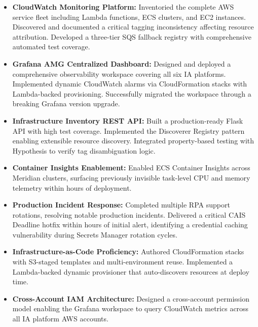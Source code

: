 \begin{itemize}
    \item \textbf{CloudWatch Monitoring Platform:} Inventoried the complete AWS
          service fleet including Lambda functions, ECS clusters, and EC2
          instances. Discovered and documented a critical tagging inconsistency
          affecting resource attribution. Developed a three-tier SQS fallback
          registry with comprehensive automated test coverage.

    \item \textbf{Grafana AMG Centralized Dashboard:} Designed and deployed a
          comprehensive observability workspace covering all six IA platforms.
          Implemented dynamic CloudWatch alarms via CloudFormation stacks with
          Lambda-backed provisioning. Successfully migrated the workspace
          through a breaking Grafana version upgrade.

    \item \textbf{Infrastructure Inventory REST API:} Built a production-ready
          Flask API with high test coverage. Implemented the Discoverer Registry
          pattern enabling extensible resource discovery. Integrated
          property-based testing with Hypothesis to verify tag disambiguation
          logic.

    \item \textbf{Container Insights Enablement:} Enabled ECS Container Insights
          across Meridian clusters, surfacing previously invisible task-level
          CPU and memory telemetry within hours of deployment.

    \item \textbf{Production Incident Response:} Completed multiple RPA support
          rotations, resolving notable production incidents. Delivered a
          critical CAIS Deadline hotfix within hours of initial alert,
          identifying a credential caching vulnerability during Secrets Manager
          rotation cycles.

    \item \textbf{Infrastructure-as-Code Proficiency:} Authored CloudFormation
          stacks with S3-staged templates and multi-environment reuse.
          Implemented a Lambda-backed dynamic provisioner that auto-discovers
          resources at deploy time.

    \item \textbf{Cross-Account IAM Architecture:} Designed a cross-account
          permission model enabling the Grafana workspace to query CloudWatch
          metrics across all IA platform AWS accounts.


\end{itemize}
